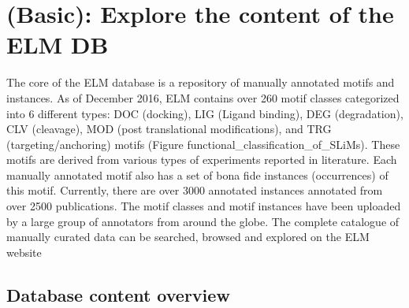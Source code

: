 \section{(Basic): Explore the content of the ELM DB}
\label{sec:explore_content}

The core of the ELM database is a repository of manually annotated motifs and
instances. As of December 2016, ELM contains over 260 motif classes categorized
into 6 different types: DOC (docking), LIG (Ligand binding), DEG (degradation),
CLV (cleavage), MOD (post translational modifications), and TRG
(targeting/anchoring) motifs (Figure functional\_classification\_of\_SLiMs).
These motifs are derived from various types of experiments reported in
literature. Each manually annotated motif also has a set of bona fide instances
(occurrences) of this motif. Currently, there are over 3000 annotated instances
annotated from over 2500 publications. The motif classes and motif instances
have been uploaded by a large group of annotators from around the globe. The
complete catalogue of manually curated data can be searched, browsed and
explored on the ELM website

%
%
\subsection{Database content overview}
\label{subsec:explore_content_database}


